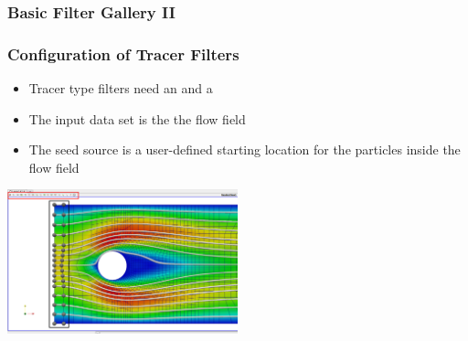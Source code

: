 \begin{frame}

  \frametitle{Basic Filter Gallery II}


\end{frame}

\begin{frame}

  \frametitle{Configuration of Tracer Filters}

    \begin{itemize}
      \item Tracer type filters need an  and a 
      \item The input data set is the the flow field  
      \item The seed source is a user-defined starting location for the particles inside the flow field  
    \end{itemize}
    \includegraphics[width=0.5\textwidth]{screenshots/tracer-source.png}

\end{frame}

